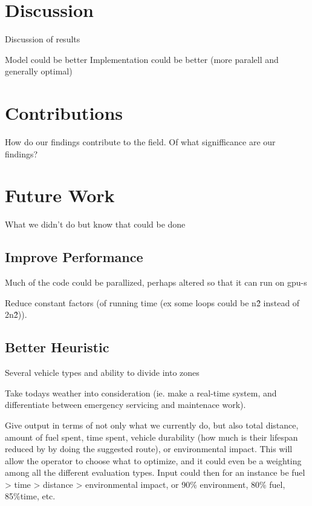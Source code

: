 
\section{Discussion}
Discussion of results

Model could be better
Implementation could be better (more paralell and generally optimal)



\section{Contributions}
How do our findings contribute to the field. Of what signifficance are our findings?

\section{Future Work}
What we didn't do but know that could be done

\subsection{Improve Performance}
Much of the code could be parallized, perhaps altered so that it can run on gpu-s

Reduce constant factors (of running time (ex some loops could be n\^2 instead of 2\*n\^2)).

\subsection{Better Heuristic}
Several vehicle types and ability to divide into zones

Take todays weather into consideration (ie. make a real-time system, and differentiate between emergency servicing and maintenace work).

Give output in terms of not only what we currently do, but also total distance, amount of fuel spent, time spent, vehicle durability (how much is their lifespan reduced by by doing the suggested route), or environmental impact. This will allow the operator to choose what to optimize, and it could even be a weighting among all the different evaluation types. Input could then for an instance be fuel > time > distance > environmental impact, or 90\% environment, 80\% fuel, 85\%time, etc.

\cleardoublepage
